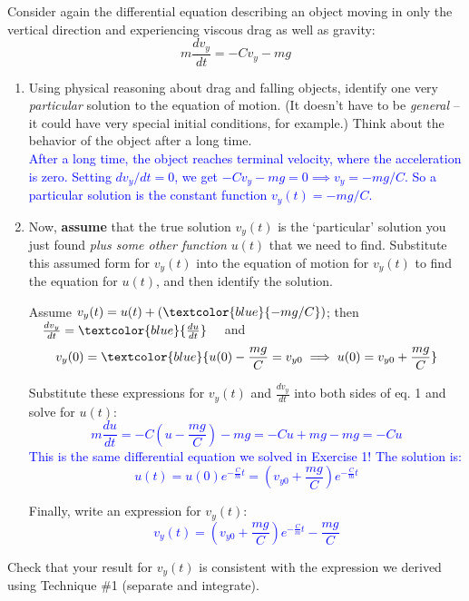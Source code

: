 \documentclass[11pt, letterpaper, openany]{book}
\newenvironment{exercise}[1][Exercise]{%
  \tcolorbox[blanker, breakable, left=1em,
    before skip=1em, after skip=1em,
    borderline west={3pt}{0pt}{PhysNavy},
    colback=PhysCream,
    before upper={\textcolor{PhysNavy}{\sffamily\bfseries #1:}\space}
  ]%
}{%
  \endtcolorbox%
}
\begin{document}
\begin{exercise}[Exercise 2]
Consider again the differential equation describing an object moving in only the vertical direction and experiencing viscous drag as well as gravity:
\[ m\frac{dv_y}{dt} = -Cv_y - mg \tag{1} \]

\begin{enumerate}[label=(\alph*)]
    \item Using physical reasoning about drag and falling objects, identify one very \textit{particular} solution to the equation of motion. (It doesn't have to be \textit{general} -- it could have very special initial conditions, for example.) Think about the behavior of the object after a long time. \\
    \textcolor{blue}{After a long time, the object reaches terminal velocity, where the acceleration is zero. Setting $dv_y/dt = 0$, we get $-Cv_y - mg = 0 \implies v_y = -mg/C$. So a particular solution is the constant function $v_y(t) = -mg/C$.}
    
    \item Now, \textbf{assume} that the true solution $v_y(t)$ is the `particular' solution you just found \textit{plus some other function} $u(t)$ that we need to find. Substitute this assumed form for $v_y(t)$ into the equation of motion for $v_y(t)$ to find the equation for $u(t)$, and then identify the solution.
    
    Assume $v_y(t) = u(t) + \left( \textcolor{blue}{-mg/C} \right)$; \quad then $\quad \frac{dv_y}{dt} = \textcolor{blue}{\frac{du}{dt}} \quad$ and 
    \[ v_y(0) = \textcolor{blue}{u(0) - \frac{mg}{C} = v_{y0} \implies u(0) = v_{y0} + \frac{mg}{C}} \]
    
    Substitute these expressions for $v_y(t)$ and $\frac{dv_y}{dt}$ into both sides of eq. 1 and solve for $u(t)$: \\
    \textcolor{blue}{
    \[ m\frac{du}{dt} = -C\left(u - \frac{mg}{C}\right) - mg = -Cu + mg - mg = -Cu \]
    This is the same differential equation we solved in Exercise 1! The solution is:
    \[ u(t) = u(0)e^{-\frac{C}{m}t} = \left(v_{y0} + \frac{mg}{C}\right)e^{-\frac{C}{m}t} \]
    }
    
    Finally, write an expression for $v_y(t)$: \\
    \textcolor{blue}{
    \[ v_y(t) = \left(v_{y0} + \frac{mg}{C}\right)e^{-\frac{C}{m}t} - \frac{mg}{C} \]
    }
\end{enumerate}
Check that your result for $v_y(t)$ is consistent with the expression we derived using Technique \#1 (separate and integrate).
\end{exercise}
\end{document}
